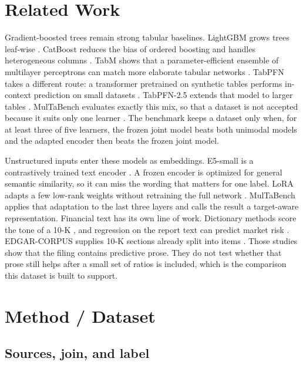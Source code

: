 \documentclass{article}
\begin{document}
\section{Related Work}

Gradient-boosted trees remain strong tabular baselines.
LightGBM grows trees leaf-wise \citep{ke2017lightgbm}.
CatBoost reduces the bias of ordered boosting and handles heterogeneous columns \citep{prokhorenkova2018catboost}.
TabM shows that a parameter-efficient ensemble of multilayer perceptrons can match more elaborate tabular networks \citep{gorishniy2025tabm}.
TabPFN takes a different route: a transformer pretrained on synthetic tables performs in-context prediction on small datasets \citep{hollmann2025tabpfn}.
TabPFN-2.5 extends that model to larger tables \citep{grinsztajn2025tabpfn25}.
MulTaBench evaluates exactly this mix, so that a dataset is not accepted because it suits only one learner \citep{arazi2026multabench}.
The benchmark keeps a dataset only when, for at least three of five learners, the frozen joint model beats both unimodal models and the adapted encoder then beats the frozen joint model.

Unstructured inputs enter these models as embeddings.
E5-small is a contrastively trained text encoder \citep{wang2022e5}.
A frozen encoder is optimized for general semantic similarity, so it can miss the wording that matters for one label.
LoRA adapts a few low-rank weights without retraining the full network \citep{hu2022lora}.
MulTaBench applies that adaptation to the last three layers and calls the result a target-aware representation.
Financial text has its own line of work.
Dictionary methods score the tone of a 10-K \citep{loughran2011liability}, and regression on the report text can predict market risk \citep{kogan2009predicting}.
EDGAR-CORPUS supplies 10-K sections already split into items \citep{loukas2021edgar}.
Those studies show that the filing contains predictive prose.
They do not test whether that prose still helps after a small set of ratios is included, which is the comparison this dataset is built to support.

\section{Method / Dataset}

\subsection{Sources, join, and label}
\end{document}
